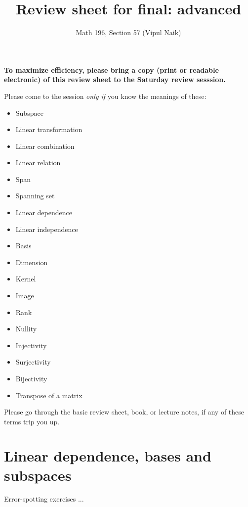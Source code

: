 \documentclass[10pt]{amsart}
\title{Review sheet for final: advanced}
\author{Math 196, Section 57 (Vipul Naik)}
\begin{document}
\maketitle

{\bf To maximize efficiency, please bring a copy (print or readable
electronic) of this review sheet to the Saturday review sesssion.}

Please come to the session {\em only if} you know the meanings of these:

\begin{itemize}
\item Subspace
\item Linear transformation
\item Linear combination
\item Linear relation
\item Span
\item Spanning set
\item Linear dependence
\item Linear independence
\item Basis
\item Dimension
\item Kernel
\item Image
\item Rank
\item Nullity
\item Injectivity
\item Surjectivity
\item Bijectivity
\item Transpose of a matrix
\end{itemize}

Please go through the basic review sheet, book, or lecture notes, if
any of these terms trip you up.

\section{Linear dependence, bases and subspaces}

Error-spotting exercises ...
\end{document}
